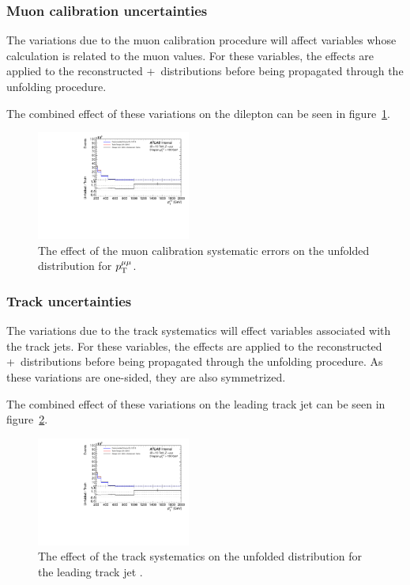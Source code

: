 \subsubsection{Muon calibration uncertainties}
The variations due to the muon calibration procedure will affect variables whose calculation is related to the muon \pt values. For these variables, the effects are applied to the reconstructed \powheg+\pythia~distributions before being propagated through the unfolding procedure.

The combined effect of these variations on the dilepton \pt can be seen in figure~\ref{fig:muCalSystErr}.

\begin{figure}[h!]
  \centering
  \includegraphics[page=150,width=0.45\textwidth]{figures/IBUPlots.pdf}
  \caption{The effect of the muon calibration systematic errors on the unfolded distribution for $p_\mathrm{T}^{\mu\mu}$.}
  \label{fig:muCalSystErr}
\end{figure}

\subsubsection{Track uncertainties}
The variations due to the track systematics will effect variables associated with the track jets. For these variables, the effects are applied to the reconstructed \powheg+\pythia~distributions before being propagated through the unfolding procedure. As these variations are one-sided, they are also symmetrized.

The combined effect of these variations on the leading track jet \pt can be seen in figure~\ref{fig:trackSystErr}.

\begin{figure}[h!]
  \centering
  \includegraphics[page=478,width=0.45\textwidth]{figures/IBUPlots.pdf}
  \caption{The effect of the track systematics on the unfolded distribution for the leading track jet \pt.}
  \label{fig:trackSystErr}
\end{figure}

